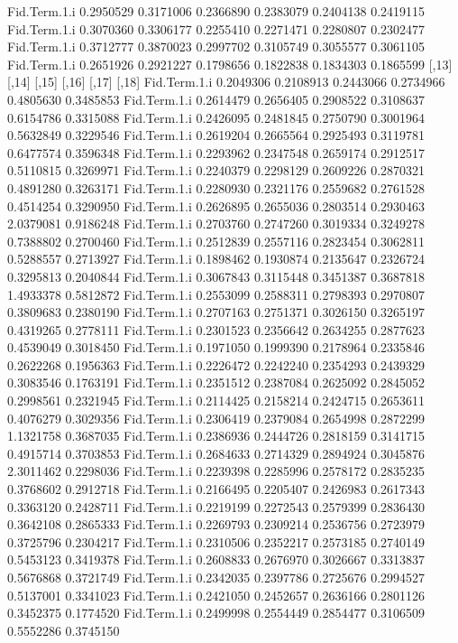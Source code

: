 \documentclass[11pt]{article} %
\begin{document}
\begin{Schunk}
\begin{Soutput}
Fid.Term.1.i 0.2950529 0.3171006 0.2366890 0.2383079 0.2404138 0.2419115
Fid.Term.1.i 0.3070360 0.3306177 0.2255410 0.2271471 0.2280807 0.2302477
Fid.Term.1.i 0.3712777 0.3870023 0.2997702 0.3105749 0.3055577 0.3061105
Fid.Term.1.i 0.2651926 0.2921227 0.1798656 0.1822838 0.1834303 0.1865599
                 [,13]     [,14]     [,15]     [,16]     [,17]     [,18]
Fid.Term.1.i 0.2049306 0.2108913 0.2443066 0.2734966 0.4805630 0.3485853
Fid.Term.1.i 0.2614479 0.2656405 0.2908522 0.3108637 0.6154786 0.3315088
Fid.Term.1.i 0.2426095 0.2481845 0.2750790 0.3001964 0.5632849 0.3229546
Fid.Term.1.i 0.2619204 0.2665564 0.2925493 0.3119781 0.6477574 0.3596348
Fid.Term.1.i 0.2293962 0.2347548 0.2659174 0.2912517 0.5110815 0.3269971
Fid.Term.1.i 0.2240379 0.2298129 0.2609226 0.2870321 0.4891280 0.3263171
Fid.Term.1.i 0.2280930 0.2321176 0.2559682 0.2761528 0.4514254 0.3290950
Fid.Term.1.i 0.2626895 0.2655036 0.2803514 0.2930463 2.0379081 0.9186248
Fid.Term.1.i 0.2703760 0.2747260 0.3019334 0.3249278 0.7388802 0.2700460
Fid.Term.1.i 0.2512839 0.2557116 0.2823454 0.3062811 0.5288557 0.2713927
Fid.Term.1.i 0.1898462 0.1930874 0.2135647 0.2326724 0.3295813 0.2040844
Fid.Term.1.i 0.3067843 0.3115448 0.3451387 0.3687818 1.4933378 0.5812872
Fid.Term.1.i 0.2553099 0.2588311 0.2798393 0.2970807 0.3809683 0.2380190
Fid.Term.1.i 0.2707163 0.2751371 0.3026150 0.3265197 0.4319265 0.2778111
Fid.Term.1.i 0.2301523 0.2356642 0.2634255 0.2877623 0.4539049 0.3018450
Fid.Term.1.i 0.1971050 0.1999390 0.2178964 0.2335846 0.2622268 0.1956363
Fid.Term.1.i 0.2226472 0.2242240 0.2354293 0.2439329 0.3083546 0.1763191
Fid.Term.1.i 0.2351512 0.2387084 0.2625092 0.2845052 0.2998561 0.2321945
Fid.Term.1.i 0.2114425 0.2158214 0.2424715 0.2653611 0.4076279 0.3029356
Fid.Term.1.i 0.2306419 0.2379084 0.2654998 0.2872299 1.1321758 0.3687035
Fid.Term.1.i 0.2386936 0.2444726 0.2818159 0.3141715 0.4915714 0.3703853
Fid.Term.1.i 0.2684633 0.2714329 0.2894924 0.3045876 2.3011462 0.2298036
Fid.Term.1.i 0.2239398 0.2285996 0.2578172 0.2835235 0.3768602 0.2912718
Fid.Term.1.i 0.2166495 0.2205407 0.2426983 0.2617343 0.3363120 0.2428711
Fid.Term.1.i 0.2219199 0.2272543 0.2579399 0.2836430 0.3642108 0.2865333
Fid.Term.1.i 0.2269793 0.2309214 0.2536756 0.2723979 0.3725796 0.2304217
Fid.Term.1.i 0.2310506 0.2352217 0.2573185 0.2740149 0.5453123 0.3419378
Fid.Term.1.i 0.2608833 0.2676970 0.3026667 0.3313837 0.5676868 0.3721749
Fid.Term.1.i 0.2342035 0.2397786 0.2725676 0.2994527 0.5137001 0.3341023
Fid.Term.1.i 0.2421050 0.2452657 0.2636166 0.2801126 0.3452375 0.1774520
Fid.Term.1.i 0.2499998 0.2554449 0.2854477 0.3106509 0.5552286 0.3745150

\end{Soutput}
\end{Schunk}
\end{document}
